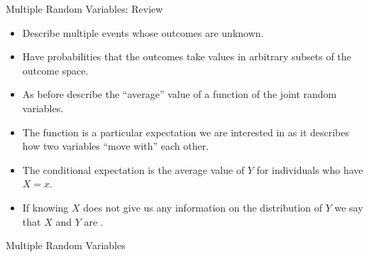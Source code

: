 \documentclass[notheorems,9pt, handout]{beamer}
\begin{document}
\begin{frame}{Multiple Random Variables: Review} 
	\label{frame:mrv-review}

	\begin{itemize}
		\item Describe multiple events whose outcomes are unknown.
		\item Have probabilities that the outcomes  take values in arbitrary subsets of the  outcome space.
	\end{itemize}

	\begin{itemize}
		\item As before describe the ``average'' value of a function of the joint random variables.
		\item The  function is a particular expectation we are interested in as it describes how two variables ``move with'' each other.
	\end{itemize}
	
	\begin{itemize}
		\item The conditional expectation is the average value of \(Y\) for individuals who have \(X=x\).
		\item If knowing \(X\) does not give us any information on the distribution of \(Y\) we say that \(X\) and \(Y\) are .
	\end{itemize}
\end{frame}
\begin{frame}{Multiple Random Variables} 
	\centering{}	
\end{frame}
\end{document}
